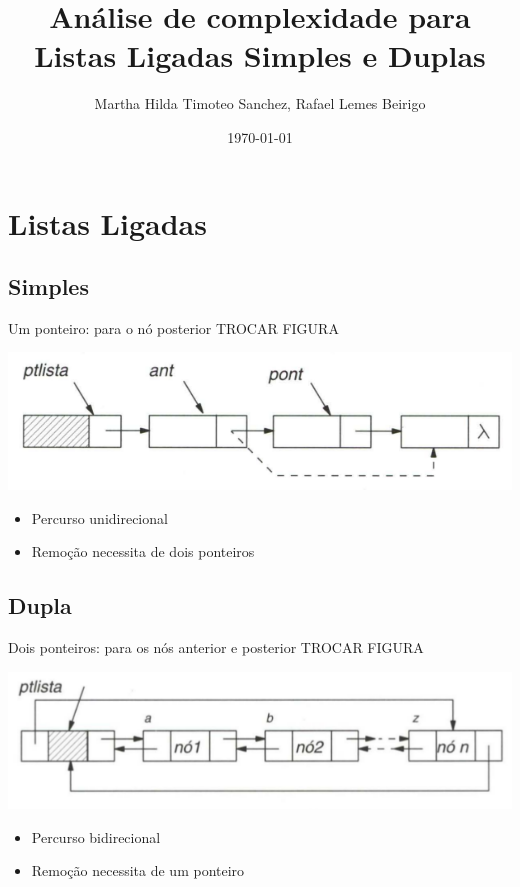 \documentclass[bigger]{beamer}
\author{Martha Hilda Timoteo Sanchez, Rafael Lemes Beirigo}
\date{\today}
\title{Análise de complexidade para Listas Ligadas Simples e Duplas}
\begin{document}
\maketitle

\section{Listas Ligadas}
\label{sec-1}
\subsection{Simples}
\label{sec-1-1}
\begin{frame}[label=sec-1-1-1]{\alert{Um} ponteiro: para o nó posterior TROCAR FIGURA}
\begin{center}
\includegraphics[width=.9\linewidth]{fig/listasimple.png}
\end{center}
\begin{itemize}
\item Percurso unidirecional
\item Remoção necessita de dois ponteiros
\end{itemize}
\end{frame}
\subsection{Dupla}
\label{sec-1-2}
\begin{frame}[label=sec-1-2-1]{\alert{Dois} ponteiros: para os nós anterior e posterior TROCAR FIGURA}
\begin{center}
\includegraphics[width=.9\linewidth]{fig/listadoble.png}
\end{center}
\begin{itemize}
\item Percurso bidirecional
\item Remoção necessita de um ponteiro
\end{itemize}
\end{frame}
\end{document}
